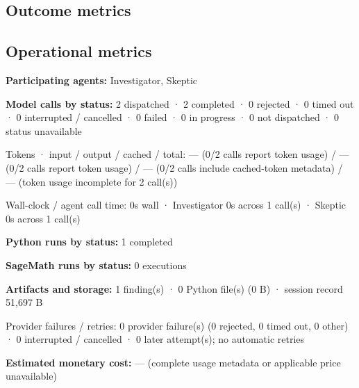 \documentclass[11pt]{article}
\begin{document}
\subsection{Outcome metrics}
\subsection{Operational metrics}
\textbf{Participating agents:} Investigator, Skeptic\par
\textbf{Model calls by status:} 2 dispatched · 2 completed · 0 rejected · 0 timed out · 0 interrupted / cancelled · 0 failed · 0 in progress · 0 not dispatched · 0 status unavailable\par
Tokens · input / output / cached / total: — (0/2 calls report token usage) / — (0/2 calls report token usage) / — (0/2 calls include cached-token metadata) / — (token usage incomplete for 2 call(s))\par
Wall-clock / agent call time: 0s wall · Investigator 0s across 1 call(s) · Skeptic 0s across 1 call(s)\par
\textbf{Python runs by status:} 1 completed\par
\textbf{SageMath runs by status:} 0 executions\par
\textbf{Artifacts and storage:} 1 finding(s) · 0 Python file(s) (0 B) · session record 51,697 B\par
Provider failures / retries: 0 provider failure(s) (0 rejected, 0 timed out, 0 other) · 0 interrupted / cancelled · 0 later attempt(s); no automatic retries\par
\textbf{Estimated monetary cost:} — (complete usage metadata or applicable price unavailable)\par
\end{document}
